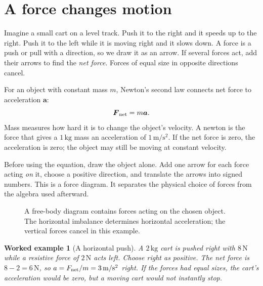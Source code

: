 \documentclass[11pt,oneside]{book}
\newcommand{\vect}[1]{\boldsymbol{#1}}
\theoremstyle{reviewstyle}
\newtheorem{example}{Worked example}[chapter]
\begin{document}
\section{A force changes motion}
Imagine a small cart on a level track. Push it to the right and it speeds up to the right. Push it to the left while it is moving right and it slows down. A force is a push or pull with a direction, so we draw it as an arrow. If several forces act, add their arrows to find the \emph{net force}. Forces of equal size in opposite directions cancel.

For an object with constant mass $m$, Newton's second law connects net force to acceleration $\vect a$:
\begin{equation}
\vect F_{\rm net}=m\vect a.
\end{equation}
Mass measures how hard it is to change the object's velocity. A newton is the force that gives a $1\,\mathrm{kg}$ mass an acceleration of $1\,\mathrm{m/s^2}$. If the net force is zero, the acceleration is zero; the object may still be moving at constant velocity.

Before using the equation, draw the object alone. Add one arrow for each force acting \emph{on} it, choose a positive direction, and translate the arrows into signed numbers. This is a force diagram. It separates the physical choice of forces from the algebra used afterward.

\begin{figure}[ht]
\centering
{}
\caption{A free-body diagram contains forces acting on the chosen object. The horizontal imbalance determines horizontal acceleration; the vertical forces cancel in this example.}
\end{figure}

\begin{example}[A horizontal push]
A $2\,\mathrm{kg}$ cart is pushed right with $8\,\mathrm N$ while a resistive force of $2\,\mathrm N$ acts left. Choose right as positive. The net force is $8-2=6\,\mathrm N$, so $a=F_{\rm net}/m=3\,\mathrm{m/s^2}$ right. If the forces had equal sizes, the cart's acceleration would be zero, but a moving cart would not instantly stop.
\end{example}
\end{document}

